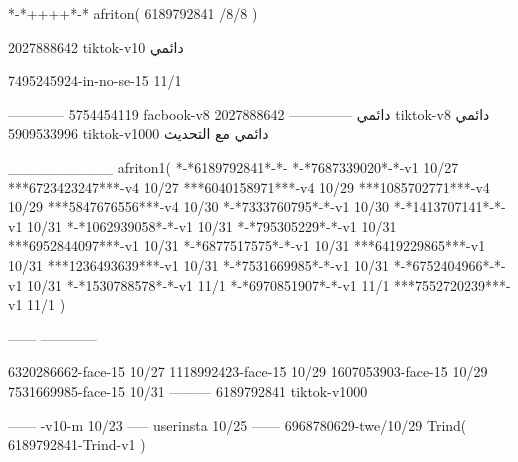 *-*++++*-*
afriton(
6189792841 /8/8
)

2027888642 tiktok-v10
دائمي


7495245924-in-no-se-15 11/1

------------
5754454119 facbook-v8
دائمي
--------------
2027888642 tiktok-v8
دائمي
5909533996 tiktok-v1000
دائمي مع التحديث

__________
afriton1(
*-*6189792841*-*-
*-*7687339020*-*-v1 10/27
***6723423247***-v4 10/27
***6040158971***-v4 10/29
***1085702771***-v4 10/29
***5847676556***-v4 10/30
*-*7333760795*-*-v1 10/30
*-*1413707141*-*-v1 10/31
*-*1062939058*-*-v1 10/31
*-*795305229*-*-v1 10/31
***6952844097***-v1 10/31
*-*6877517575*-*-v1 10/31
***6419229865***-v1 10/31
***1236493639***-v1 10/31
*-*7531669985*-*-v1 10/31
*-*6752404966*-*-v1 10/31
*-*1530788578*-*-v1 11/1
*-*6970851907*-*-v1 11/1
***7552720239***-v1 11/1
)

------
------------


6320286662-face-15 10/27
1118992423-face-15 10/29
1607053903-face-15 10/29
7531669985-face-15 10/31
---------
6189792841 tiktok-v1000

------
-v10-m 10/23
-----
userinsta 10/25
------
6968780629-twe/10/29
Trind(
6189792841-Trind-v1 
)
